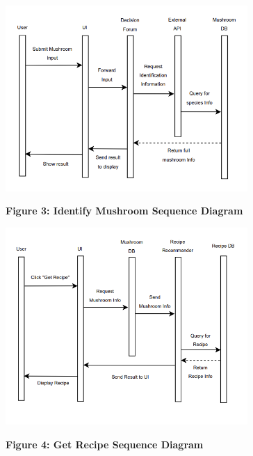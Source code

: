 \documentclass[]{article}
\begin{document}
\vspace{1.5cm}

\begin{figure}[h]
    \centering

    \begin{minipage}[b]{\textwidth}
        \centering
        \includegraphics[width=0.82\textwidth]{IdentifyMushroomSequenceDiagram.png}
        \vspace{0.1cm}
        
        \textbf{Figure 3: Identify Mushroom Sequence Diagram}
    \end{minipage}

    \vspace{0.5cm}

    \begin{minipage}[b]{\textwidth}
        \centering
        \includegraphics[width=0.82\textwidth]{GetRecipeSequenceDiagram.png}
        \vspace{0.1cm}
        
        \textbf{Figure 4: Get Recipe Sequence Diagram}
    \end{minipage}
\end{figure}
\end{document}
